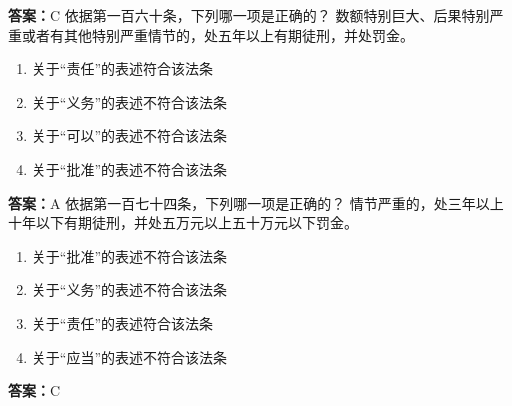 \documentclass[12pt]{ctexart}
\begin{document}
\begin{questions}
\ifprintanswers\par\textbf{答案：}C\fi
\question 依据第一百六十条，下列哪一项是正确的？
数额特别巨大、后果特别严重或者有其他特别严重情节的，处五年以上有期徒刑，并处罚金。
\begin{enumerate}[label=\Alph*.]
\item 关于“责任”的表述符合该法条
\item 关于“义务”的表述不符合该法条
\item 关于“可以”的表述不符合该法条
\item 关于“批准”的表述不符合该法条
\end{enumerate}
\ifprintanswers\par\textbf{答案：}A\fi
\question 依据第一百七十四条，下列哪一项是正确的？
情节严重的，处三年以上十年以下有期徒刑，并处五万元以上五十万元以下罚金。
\begin{enumerate}[label=\Alph*.]
\item 关于“批准”的表述不符合该法条
\item 关于“义务”的表述不符合该法条
\item 关于“责任”的表述符合该法条
\item 关于“应当”的表述不符合该法条
\end{enumerate}
\ifprintanswers\par\textbf{答案：}C\fi
\end{questions}
\end{document}
